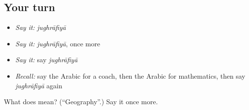 \subsection*{Your turn}
\begin{itemize}
\raggedright
  \item \emph{Say it:} \emph{jughrāfiyā}
  \item \emph{Say it:} \emph{jughrāfiyā}, once more
  \item \emph{Say it:} say \emph{jughrāfiyā}
  \item \emph{Recall:} say the Arabic for a coach, then the Arabic for mathematics, then say \emph{jughrāfiyā} again
\end{itemize}

\begin{tcolorbox}[breakable,colback=teal!4,colframe=teal!35!black,title={Before you move on}]
What does  mean? (\textquotedblleft{}Geography\textquotedblright{}.) Say it once more.
\end{tcolorbox}
